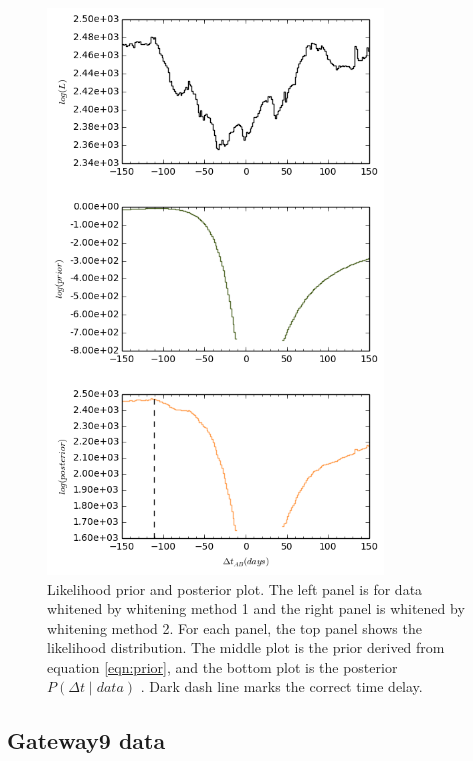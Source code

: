 \documentclass[\docopts]{\docclass}
\begin{document}
\begin{figure}[!h]
\begin{minipage}[bottom]{0.4\textwidth}
\includegraphics[width=\textwidth, height=15cm, keepaspectratio]{whiten2/data8_full_log.png}
  \end{minipage}
 \caption{Likelihood prior and posterior plot. The left panel is for data whitened by whitening method 1 and the right panel is whitened by whitening method 2. For each panel, the top panel shows the likelihood distribution. The middle plot is the prior derived from equation \ref{eqn:prior}, and the bottom plot is the posterior $P(\Delta t \mid data)$ . Dark dash line marks the correct time delay. }
\end{figure}
\newpage

\subsection{Gateway9 data}
\end{document}

